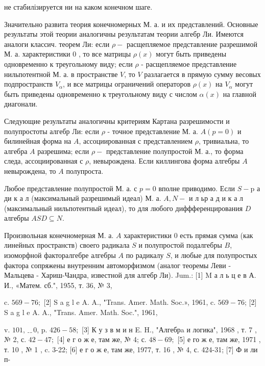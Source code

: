 \documentclass[10pt]{article}
\begin{document}
не стабилізируется ни на каком конечном шаге.



Значительно развита теория конечномерных М. а. и их представлений. Основные результаты этой теории аналогичны результатам теории алгебр Ли. Имеются аналоги классич. теорем Ли: если $\rho-$ расщепляемое представление разрешимой М. а. характеристики 0 , то все матрицы $\rho(x)$ могут быть приведены одновременно к треугольному виду; если $\rho$ - расщепляемое представление нильпотентной М. а. в пространстве $V$, то $V$ разлагается в прямую сумму весовых подпространств $V_{\alpha}$, и все матрицы ограничений операторов $\rho(x)$ на $V_{\alpha}$ могут быть приведены одновременно к треугольному виду с числом $\alpha(x)$ на главной диагонали.



Следующие результаты аналогичны критериям Картана разрешимости и полупростоты алгебр Ли: если $\rho$ - точное представление М. а. $A(p=0)$ и билинейная форма на $A$, ассоциированная с представлением $\rho$, тривиальна, то алгебра $A$ разрешима; если $\rho-$ представление полупростой М. а., то форма следа, ассоциированная с $\rho$, невырождена. Если киллингова форма алгебры $A$ невырождена, то $A$ полупроста.



Любое представление полупростой М. а. с $p=0$ вполне приводимо. Если $S-\mathrm{p}$ а ди к а л (максимальный разрешимый идеал) М. а. $A, N-$ и л ьр а д и к а л (максимальный нильпотентный идеал), то для любого диффференцирования $D$ алгебры $A S D \subseteq N$.



Произвольная конечномерная М. а. $A$ характеристики 0 есть прямая сумма (как линейных пространств) своего радикала $S$ и полупростой подалгебры $B$, изоморфной факторалгебре алгебры $A$ по радикалу $S$, и любые для полупростых фактора сопряжены внутренним автоморфизмом (аналог теоремы Леви - Мальцева - Хариш-Чандра, известной для алгебр Ли). Jum.: [1] M а л ь ц е в А. И., «Матем. сб.", 1955, т. 36, № 3,

c. $569-76 ;$ [2] S a g l e A. A., "Trans. Amer. Math. Soc.», 1961, c. $569-76$; [2] S a g l e A. A., "Trans. Amer. Math. Soc.", 1961,

v. $101, ﹎{0}$, p. $426-58 ;$ [3] К у з в м и н E. H., "Алгебрa и логика", 1968 , т. 7 , № 2, с. $42-47 ;$ [4] е г о ж е, там же, № 4; с. $48-69 ;$ [5] е го ж е, там же, 1971 , т. 10 , № 1 , c. 3-22; [6] е г о ж е, там же, 1977, т. 16 , № 4, с. 424-31; [7] Ф и ли п-
\end{document}
